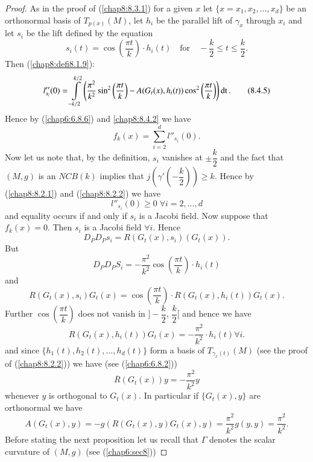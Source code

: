 \begin{proof}
As in the proof of (\ref{chap8:8.3.1}) for a given $x$ let
$\{x=x_{1},x_{2},\ldots,x_{d}\}$ be an orthonormal basis of
$T_{p(x)}(M)$, let $h_{i}$ be the parallel lift of $\gamma_{x}$
through $x_{i}$ and let $s_{i}$ be the lift defined by the equation
\begin{equation*}
s_{i}(t)=\cos \left(\frac{\pi t}{k}\right)\cdot
h_{i}(t)\quad\text{for}\quad -\frac{k}{2}\leq t\leq
\frac{k}{2}.\tag{8.4.4}\label{chap8:8.4.4} 
\end{equation*}
Then (\ref{chap8:defi8.1.9}):
\begin{equation*}
l''_{s_{i}}(0)=\int\limits^{k/2}_{-k/2}\left(\dfrac{\pi^{2}}{k^{2}}\sin^{2}\left(\frac{\pi
  t}{k}\right)-A(G_{t}(x),
h_{i}(t))\cos^{2}\left(\frac{\pi
  t}{k}\right)\right)\operatorname{dt}.\tag{8.4.5}\label{chap8:8.4.5}  
\end{equation*}
Hence by (\ref{chap6:6.8.6}) and \eqref{chap8:8.4.2} we have
\begin{equation*}
f_{k}(x)=\sum^{d}_{i=2}l''_{s_{i}}(0).\tag{8.4.6}\label{chap8:8.4.6}  
\end{equation*}
Now \pageoriginale let us note that, by the definition, $s_{i}$
vanishes at $\pm\dfrac{k}{2}$ and the fact that $(M,g)$ is an $NCB(k)$
implies that $j(\gamma'(-\dfrac{k}{2}))\geq k$. Hence by
(\ref{chap8:8.2.1}) and (\ref{chap8:8.2.2}) we have
$$
l''_{s_{i}}(0)\geq 0 \; \forall i=2,\ldots,d
$$
and equality occurs if and only if $s_{i}$ is a Jacobi field. Now
suppose that $f_{k}(x)=0$. Then $s_{i}$ is a Jacobi field $\forall
i$. Hence
$$
D_{P}D_{P}s_{i}=R(G_{t}(x),s_{i})(G_{t}(x)).
$$
But
$$
D_{P}D_{P}S_{i}=-\dfrac{\pi^{2}}{k^{2}}\cos\left(\dfrac{\pi t}{k}\right)\cdot
h_{i}(t)
$$
and
$$
R(G_{t}(x),s_{i})G_{t}(x)=\cos \left(\dfrac{\pi t}{k}\right)\cdot
R(G_{t}(x), h_{i}(t))G_{t}(x).
$$
Further $\cos(\dfrac{\pi t}{k})$ does not vanish in
$]-\dfrac{k}{2}$, $\dfrac{k}{2}[$ and hence we have
$$
R(G_{t}(x), h_{i}(t))G_{t}(x)=-\frac{\pi^{2}}{k^{2}}\cdot
h_{i}(t)\forall i.
$$
and since $\{h_{1}(t),h_{2}(t),\ldots,h_{d}(t)\}$ form a basis of
$T_{\gamma_{x}(t)}(M)$ (see the proof of (\ref{chap8:8.2.2})) we have
(see (\ref{chap6:6.8.2}))
$$
\overline{R}(G_{t}(x))y=-\frac{\pi^{2}}{k^{2}}y
$$
whenever $y$ is orthogonal to $G_{t}(x)$. In particular if
$\{G_{t}(x),y\}$ are orthonormal we have
$$
A(G_{t}(x),y)=-g(R(G_{t}(x),y)G_{t}(x),y)=\dfrac{\pi^{2}}{k^{2}}g(y,y)=\dfrac{\pi^{2}}{k^{2}}. 
$$
Before stating the next proposition let us recall that $\Gamma$
denotes the scalar curvature of $(M,g)$ (see (\ref{chap6:sec8}))
\end{proof}

